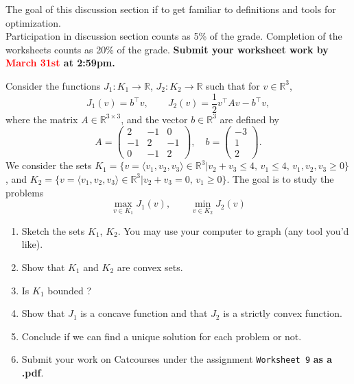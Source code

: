 \documentclass[11pt]{article}
\begin{document}
The goal of this discussion section if to get familiar to definitions and tools for optimization.\\
Participation in discussion section counts as 5\% of the grade. Completion of the worksheets counts as 20\% of the grade. \textbf{Submit your worksheet work by \textcolor{red}{March 31st} at 2:59pm.}

Consider the functions $J_1: K_1 \to \mathbb{R}$, $J_2: K_2 \to \mathbb{R}$ such that for $v \in \mathbb{R}^3$, 
\[ J_1(v) = b^\intercal v, \qquad J_2(v) = \frac{1}{2} v^\intercal A v - b^\intercal v,\]
where the matrix $A \in \mathbb{R}^{3 \times 3}$, and the vector $b\in \mathbb{R}^3$ are defined by
\[
A = \begin{pmatrix}
2 & -1 & 0 \\
-1 & 2 & -1 \\
0 & -1 & 2
\end{pmatrix}, \quad b = \begin{pmatrix}
-3 \\ 1 \\2
\end{pmatrix}.
\]
We consider the sets $K_1 = \lbrace  v  = \langle v_1, v_2, v_3\rangle \in \mathbb{R}^3 | v_2 + v_3 \leq 4, \, v_1 \leq 4, \, v_1, v_2, v_3  \geq 0\rbrace$, and $K_2 = \lbrace  v  = \langle v_1, v_2, v_3\rangle \in \mathbb{R}^3 | v_2 + v_3 = 0, \, v_1 \geq 0\rbrace$.
The goal is to study the problems
\[  \underset{ v \in K_1}{\max} J_1(v), \qquad \underset{ v \in K_2}{\min} J_2(v)\]

\begin{enumerate}
\item Sketch the sets $K_1$, $K_2$. You may use your computer to graph (any tool you'd like).
\item Show that $K_1$ and $K_2$  are convex sets.
\item Is $K_1$ bounded ?
\item Show that $J_1$ is a concave function and that $J_2$ is a strictly convex function.
\item Conclude if we can find a unique solution for each problem or not.
\item Submit your work on Catcourses under the assignment \texttt{Worksheet 9} \textbf{as a .pdf}. 
\end{enumerate}
\end{document}

